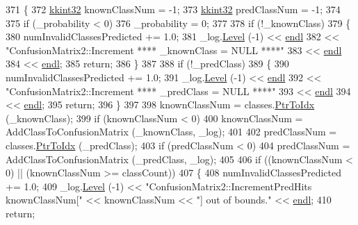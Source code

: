 \begin{DoxyCode}
371 \{
372   \hyperlink{namespace_k_k_b_a8fa4952cc84fda1de4bec1fbdd8d5b1b}{kkint32}  knownClassNum = -1;
373   \hyperlink{namespace_k_k_b_a8fa4952cc84fda1de4bec1fbdd8d5b1b}{kkint32}  predClassNum  = -1;
374 
375   \textcolor{keywordflow}{if}  (\_probability < 0)
376     \_probability = 0;
377 
378   \textcolor{keywordflow}{if}  (!\_knownClass)
379   \{
380     numInvalidClassesPredicted += 1.0;
381     \_log.\hyperlink{class_k_k_b_1_1_run_log_a32cf761d7f2e747465fd80533fdbb659}{Level} (-1) << \hyperlink{namespace_k_k_b_ad1f50f65af6adc8fa9e6f62d007818a8}{endl}
382                    << \textcolor{stringliteral}{"ConfusionMatrix2::Increment  **** \_knownClass = NULL ****"}
383                    << \hyperlink{namespace_k_k_b_ad1f50f65af6adc8fa9e6f62d007818a8}{endl}
384                    << \hyperlink{namespace_k_k_b_ad1f50f65af6adc8fa9e6f62d007818a8}{endl};
385     \textcolor{keywordflow}{return};
386   \}
387 
388   \textcolor{keywordflow}{if}  (!\_predClass)
389   \{
390     numInvalidClassesPredicted += 1.0;
391     \_log.\hyperlink{class_k_k_b_1_1_run_log_a32cf761d7f2e747465fd80533fdbb659}{Level} (-1) << \hyperlink{namespace_k_k_b_ad1f50f65af6adc8fa9e6f62d007818a8}{endl}
392                    << \textcolor{stringliteral}{"ConfusionMatrix2::Increment  **** \_predClass = NULL ****"}
393                    << \hyperlink{namespace_k_k_b_ad1f50f65af6adc8fa9e6f62d007818a8}{endl}
394                    << \hyperlink{namespace_k_k_b_ad1f50f65af6adc8fa9e6f62d007818a8}{endl};
395     \textcolor{keywordflow}{return};
396   \}
397 
398   knownClassNum = classes.\hyperlink{class_k_k_b_1_1_k_k_queue_ac7c26abdf599669a4b0898534f735f99}{PtrToIdx} (\_knownClass);
399   \textcolor{keywordflow}{if}  (knownClassNum < 0)
400     knownClassNum = AddClassToConfusionMatrix (\_knownClass, \_log);
401 
402   predClassNum  = classes.\hyperlink{class_k_k_b_1_1_k_k_queue_ac7c26abdf599669a4b0898534f735f99}{PtrToIdx} (\_predClass);
403   \textcolor{keywordflow}{if}  (predClassNum < 0)
404     predClassNum = AddClassToConfusionMatrix (\_predClass, \_log);
405 
406   \textcolor{keywordflow}{if}  ((knownClassNum < 0)  ||  (knownClassNum >= classCount))
407   \{
408     numInvalidClassesPredicted += 1.0;
409     \_log.\hyperlink{class_k_k_b_1_1_run_log_a32cf761d7f2e747465fd80533fdbb659}{Level} (-1) << \textcolor{stringliteral}{"ConfusionMatrix2::IncrementPredHits    knownClassNum["} << knownClassNum << \textcolor{stringliteral}{"]
       out of bounds."} << \hyperlink{namespace_k_k_b_ad1f50f65af6adc8fa9e6f62d007818a8}{endl};
410     \textcolor{keywordflow}{return};

\end{DoxyCode}
